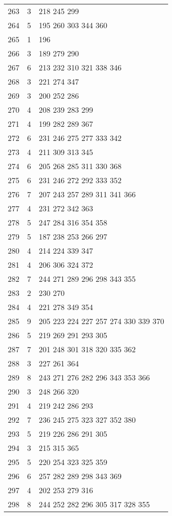 \documentclass{standalone}
\begin{document}
\begin{tabular}{c c l}
263 & 3 & 218 245 299 \\
264 & 5 & 195 260 303 344 360 \\
265 & 1 & 196 \\
266 & 3 & 189 279 290 \\
267 & 6 & 213 232 310 321 338 346 \\
268 & 3 & 221 274 347 \\
269 & 3 & 200 252 286 \\
270 & 4 & 208 239 283 299 \\
271 & 4 & 199 282 289 367 \\
272 & 6 & 231 246 275 277 333 342 \\
273 & 4 & 211 309 313 345 \\
274 & 6 & 205 268 285 311 330 368 \\
275 & 6 & 231 246 272 292 333 352 \\
276 & 7 & 207 243 257 289 311 341 366 \\
277 & 4 & 231 272 342 363 \\
278 & 5 & 247 284 316 354 358 \\
279 & 5 & 187 238 253 266 297 \\
280 & 4 & 214 224 339 347 \\
281 & 4 & 206 306 324 372 \\
282 & 7 & 244 271 289 296 298 343 355 \\
283 & 2 & 230 270 \\
284 & 4 & 221 278 349 354 \\
285 & 9 & 205 223 224 227 257 274 330 339 370 \\
286 & 5 & 219 269 291 293 305 \\
287 & 7 & 201 248 301 318 320 335 362 \\
288 & 3 & 227 261 364 \\
289 & 8 & 243 271 276 282 296 343 353 366 \\
290 & 3 & 248 266 320 \\
291 & 4 & 219 242 286 293 \\
292 & 7 & 236 245 275 323 327 352 380 \\
293 & 5 & 219 226 286 291 305 \\
294 & 3 & 215 315 365 \\
295 & 5 & 220 254 323 325 359 \\
296 & 6 & 257 282 289 298 343 369 \\
297 & 4 & 202 253 279 316 \\
298 & 8 & 244 252 282 296 305 317 328 355 \\

\end{tabular}
\end{document}
